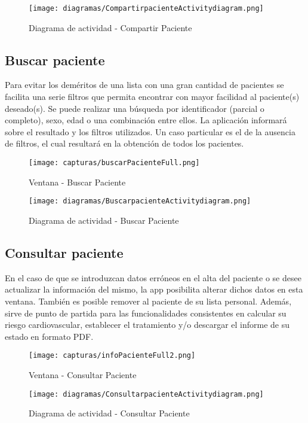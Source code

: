 \documentclass[11pt,spanish,
		listoftables,listoffigures]
		{tfgplantilla}
\begin{document}
\begin{figure}[H]
\centering
\texttt{[image: diagramas/CompartirpacienteActivitydiagram.png]}
\caption{Diagrama de actividad - Compartir Paciente}
\end{figure}

\subsection {Buscar paciente}

Para evitar los deméritos de una lista con una gran cantidad de pacientes se facilita una serie filtros que permita encontrar con mayor facilidad al paciente(s) deseado(s). Se puede realizar una búsqueda  por identificador (parcial o completo), sexo, edad o una combinación entre ellos. La aplicación informará sobre el resultado y los filtros utilizados. Un caso particular es el de la ausencia de filtros, el cual resultará en la obtención de todos los pacientes.

\begin{figure}[H]
\centering
\texttt{[image: capturas/buscarPacienteFull.png]}
\caption{Ventana - Buscar Paciente}
\end{figure}

\begin{figure}[H]
\centering
\texttt{[image: diagramas/BuscarpacienteActivitydiagram.png]}
\caption{Diagrama de actividad - Buscar Paciente}
\end{figure}

\subsection {Consultar paciente}

En el caso de que se introduzcan datos erróneos en el alta del paciente o se desee actualizar la información del mismo, la app posibilita alterar dichos datos en esta ventana. También es posible remover al paciente de su lista personal. Además, sirve de punto de partida para las funcionalidades consistentes en calcular su riesgo cardiovascular, establecer el tratamiento y/o descargar el informe de su estado en formato PDF.

\begin{figure}[H]
\centering
\texttt{[image: capturas/infoPacienteFull2.png]}
\caption{Ventana - Consultar Paciente}
\end{figure}

\begin{figure}[H]
\centering
\texttt{[image: diagramas/ConsultarpacienteActivitydiagram.png]}
\caption{Diagrama de actividad - Consultar Paciente}
\end{figure}
\end{document}
